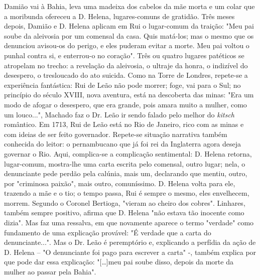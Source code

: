 Damião vai à Bahia, leva uma madeixa dos cabelos da mãe morta e um colar
que a moribunda ofereceu a D. Helena, lugares-comuns de gratidão. Três
meses depois, Damião e D. Helena aplicam em Rui o lugar-comum da
traição: "Meu pai soube da aleivosia por um comensal da casa. Quis
matá-los; mas o mesmo que os denunciou avisou-os do perigo, e eles
puderam evitar a morte. Meu pai voltou o punhal contra si, e enterrou-o
no coração". Três ou quatro lugares patéticos se atropelam no trecho: a
revelação da aleivosia, o ultraje da honra, o indizível do desespero, o
tresloucado do ato suicida. Como na Torre de Londres, repete-se a
experiência fantástica: Rui de Leão não pode morrer; foge, vai para o
Sul; no princípio do século XVIII, nova aventura, está na descoberta das
minas: "Era um modo de afogar o desespero, que era grande, pois amara
muito a mulher, como um louco...", Machado faz o Dr. Leão ir sendo
falado pelo melhor do \emph{kitsch} romântico. Em 1713, Rui de Leão está
no Rio de Janeiro, rico com as minas e com ideias de ser feito
governador. Repete-se situação narrativa também conhecida do leitor: o
pernambucano que já foi rei da Inglaterra agora deseja governar o Rio.
Aqui, complica-se a complicação sentimental: D. Helena retorna,
lugar-comum, mostra-lhe uma carta escrita pelo comensal, outro lugar;
nela, o denunciante pede perdão pela calúnia, mais um, declarando que
mentiu, outro, por "criminosa paixão", mais outro, comuníssimo. D.
Helena volta para ele, trazendo a mãe e o tio; o tempo passa, Rui é
sempre o mesmo, eles envelhecem, morrem. Segundo o Coronel Bertioga,
"vieram ao cheiro dos cobres". Linhares, também sempre positivo, afirma
que D. Helena "não estava tão inocente como dizia". Mas faz uma
ressalva, em que novamente aparece o termo "verdade" como fundamento de
uma explicação provável: "É verdade que a carta do denunciante...". Mas
o Dr. Leão é peremptório e, explicando a perfídia da ação de D. Helena
-- "O denunciante foi pago para escrever a carta" -, também explica por
que pode dar essa explicação: "{[}\ldots{}{]}meu pai soube disso, depois
da morte da mulher ao passar pela Bahia".

